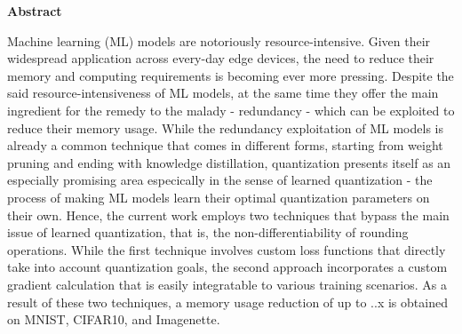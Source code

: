\thispagestyle{empty}
\vspace*{1.0cm}

\begin{center}
    \textbf{Abstract} \label{abstract}
\end{center}

\vspace*{0.5cm}

\noindent Machine learning (ML) models are notoriously resource-intensive.
Given their widespread application across every-day edge devices,
the need to reduce their memory and computing requirements is becoming ever more pressing.
Despite the said resource-intensiveness of ML models, at the same time 
they offer the main ingredient for the remedy to the malady - redundancy - 
which can be exploited to reduce their memory usage.
While the redundancy exploitation of ML models is already a common 
technique that comes in different forms, starting from weight pruning \cite{han2016deepcompression} and
ending with knowledge distillation, quantization presents itself as an especially promising 
area especically in the sense of learned quantization - 
the process of making ML models learn their optimal quantization parameters
on their own.
Hence, the current work employs two techniques that bypass the main issue of learned quantization,
that is, the non-differentiability of rounding operations.
While the first technique involves custom loss functions that directly take into account
quantization goals, the second approach incorporates a custom gradient calculation that is
easily integratable to various training scenarios.
As a result of these two techniques, a memory usage reduction of up to ..x is obtained 
on MNIST, CIFAR10, and Imagenette. 